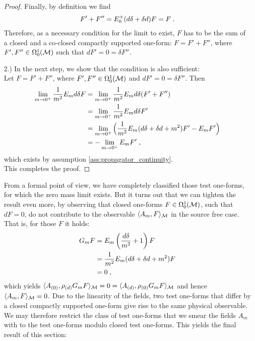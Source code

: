 \begin{proof}
	Finally, by definition we find
	\begin{align}
		F' + F '' = E_0^+ (d \delta + \delta d) F = F \;.
	\end{align}
	Therefore, as a necessary condition for the limit to exist, $F$ has to be the sum of a closed and a co-closed compactly supported one-form: $F = F' + F''$, where $F',F'' \in \Omega^1_0(\mathcal{M})$  such that $dF' = 0 = \delta F''$. \par
	2.) In the next step, we show that the condition is also sufficient:\\
	Let $F = F' + F''$, where $F', F'' \in \Omega^1_0(\mathcal{M})$ and $dF' = 0 = \delta F''$. Then
	\begin{align}
		\lim\limits_{m \to 0^+} \frac{1}{m^2} E_m d \delta F
		&=	\lim\limits_{m \to 0^+} \frac{1}{m^2} E_m d \delta (F' + F '') \notag\\
		&=  \lim\limits_{m \to 0^+} \frac{1}{m^2} E_m d \delta F'  \notag\\
		&= \lim\limits_{m \to 0^+} \Big( \frac{1}{m^2} E_m (d \delta + \delta d + m^2) F' - E_m F'\Big)\notag\\
		& = - \lim\limits_{m \to 0^+}  E_m F' \;,
	\end{align}
	which exists by assumption \ref{ass:propagator_continuity}. \\
	This completes the proof.
\end{proof}
From a formal point of view, we have completely classified those test one-forms, for which the zero mass limit exists. But it turns out that we can tighten the result even more, by observing that closed one-forms $F \in \Omega^1_0(\mathcal{M})$, such that $dF=0$, do not contribute to the observable $\langle A_m , F \rangle_{\mathcal{M}}$ in the source free case. That is, for those $F$ it holds:
\begin{align}
	G_m F
	&= E_m  \left( \frac{d \delta}{m^2} + 1\right) F \notag \\
	&= \frac{1}{m^2}E_m (d \delta + \delta d + m^2) F \notag\\
	&= 0 \;,
\end{align}
which yields $\langle {A_{(0)}}, \rho_{(d)} G_m F \rangle_{\mathcal{M}} = 0 = \langle {A_{(d)}}, \rho_{(0)} G_m F \rangle_{\mathcal{M}}$ and hence $\langle A_m , F \rangle_{\mathcal{M}}= 0$. Due to the linearity of the fields, two test one-forms that differ by a closed compactly supported one-form give rise to the same physical observable. We may therefore restrict the class of test one-forms that we smear the fields $A_m$ with to the test one-forms modulo closed test one-forms. This yields the final result of this section:
